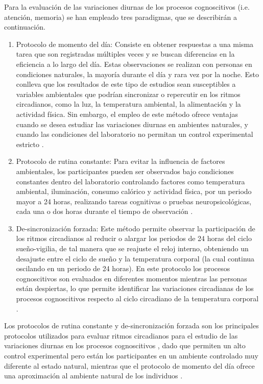 \documentclass[12pt,letterpaper,final]{article}
\let\cite\cite %
\begin{document}
Para la evaluación de las variaciones diurnas de los procesos cognoscitivos (i.e. atención, memoria) se han empleado tres paradigmas, que se describirán a continuación.

\begin{enumerate}
	\item Protocolo de momento del día:
	Consiste en obtener respuestas a una misma tarea que son registradas múltiples veces y se buscan diferencias en la eficiencia a lo largo del día. Estas observaciones se realizan con personas en condiciones naturales, la mayoría durante el día y rara vez por la noche. Esto conlleva que los resultados de este tipo de estudios sean susceptibles a variables ambientales que podrían sincronizar o repercutir en los ritmos circadianos, como la luz, la temperatura ambiental,  la alimentación y la actividad física. Sin embargo, el empleo de este método ofrece ventajas cuando se desea estudiar las variaciones diurnas en ambientes naturales, y cuando las condiciones del laboratorio no permitan un control experimental estricto \cite{Blatter2007}.

	\item Protocolo de rutina constante:
	Para evitar la influencia de factores ambientales, los participantes pueden ser observados bajo condiciones constantes dentro del laboratorio controlando factores como temperatura ambiental, iluminación, consumo calórico y actividad física, por un periodo mayor a 24 horas, realizando tareas cognitivas o pruebas neuropsicológicas, cada una o dos horas durante el tiempo de observación \cite{Duffy2002}.

	\item De-sincronización forzada:
	Este método permite observar la participación de los ritmos circadianos al reducir o alargar los periodos de 24 horas del ciclo sueño-vigilia, de tal manera que se reajuste el reloj interno, obteniendo un desajuste entre el ciclo de sueño y la temperatura corporal (la cual continua oscilando en un periodo de 24 horas). En este protocolo los procesos cognoscitivos  son evaluados en diferentes momentos mientras las personas están despiertas, lo que permite identificar las variaciones circadianas de los procesos cognoscitivos  respecto al ciclo circadiano de la temperatura corporal \cite{Hanneman2001}.
\end{enumerate}

Los protocolos de rutina constante y de-sincronización forzada son los principales protocolos utilizados para evaluar ritmos circadianos para el estudio de las variaciones diurnas en los procesos cognoscitivos , dado que permiten un alto   control experimental pero están los participantes en un ambiente controlado muy diferente al estado natural, mientras que el protocolo de momento del día ofrece una aproximación al ambiente natural  de los individuos \cite{Valdez2014}.
\end{document}
